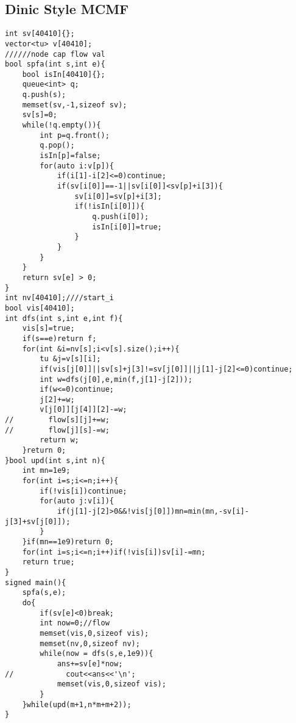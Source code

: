 \documentclass[landscape, 8pt, a4paper, oneside, twocolumn]{extarticle}
\begin{document}
\subsection{Dinic Style MCMF}
\begin{verbatim}
int sv[40410]{};
vector<tu> v[40410];
//////node cap flow val
bool spfa(int s,int e){
    bool isIn[40410]{};
    queue<int> q;
    q.push(s);
    memset(sv,-1,sizeof sv);
    sv[s]=0;
    while(!q.empty()){
        int p=q.front();
        q.pop();
        isIn[p]=false;
        for(auto i:v[p]){
            if(i[1]-i[2]<=0)continue;
            if(sv[i[0]]==-1||sv[i[0]]<sv[p]+i[3]){
                sv[i[0]]=sv[p]+i[3];
                if(!isIn[i[0]]){
                    q.push(i[0]);
                    isIn[i[0]]=true;
                }
            }
        }
    }
    return sv[e] > 0;
}
int nv[40410];////start_i
bool vis[40410];
int dfs(int s,int e,int f){
    vis[s]=true;
    if(s==e)return f;
    for(int &i=nv[s];i<v[s].size();i++){
        tu &j=v[s][i];
        if(vis[j[0]]||sv[s]+j[3]!=sv[j[0]]||j[1]-j[2]<=0)continue;
        int w=dfs(j[0],e,min(f,j[1]-j[2]));
        if(w<=0)continue;
        j[2]+=w;
        v[j[0]][j[4]][2]-=w;
//        flow[s][j]+=w;
//        flow[j][s]-=w;
        return w;
    }return 0;
}bool upd(int s,int n){
    int mn=1e9;
    for(int i=s;i<=n;i++){
        if(!vis[i])continue;
        for(auto j:v[i]){
            if(j[1]-j[2]>0&&!vis[j[0]])mn=min(mn,-sv[i]-j[3]+sv[j[0]]);
        }
    }if(mn==1e9)return 0;
    for(int i=s;i<=n;i++)if(!vis[i])sv[i]-=mn;
    return true;
}
signed main(){
    spfa(s,e);
    do{
        if(sv[e]<0)break;
        int now=0;//flow
        memset(vis,0,sizeof vis);
        memset(nv,0,sizeof nv);
        while(now = dfs(s,e,1e9)){
            ans+=sv[e]*now;
//            cout<<ans<<'\n';
            memset(vis,0,sizeof vis);
        }
    }while(upd(m+1,n*m+m+2));
}
\end{verbatim}
\end{document}
